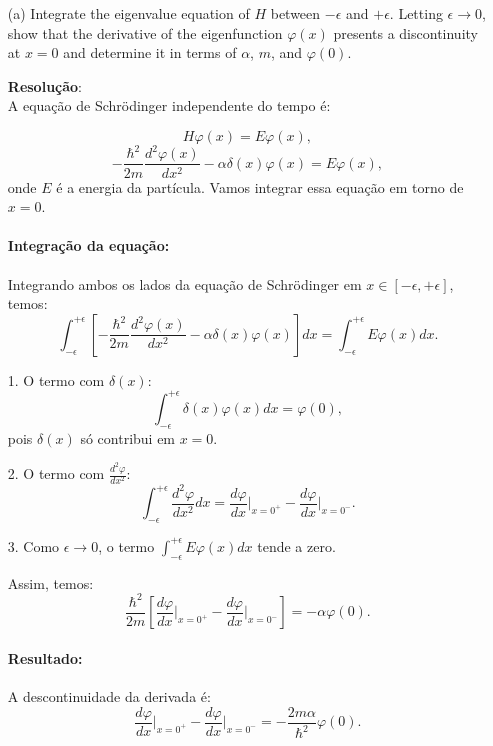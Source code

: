\documentclass[a4paper,12pt]{article}
\begin{document}
\begin{enumerate}
    \item[(a)] Integrate the eigenvalue equation of \( H \) between \( -\epsilon \) and \( +\epsilon \). Letting \( \epsilon \to 0 \), show that the derivative of the eigenfunction \( \varphi(x) \) presents a discontinuity at \( x = 0 \) and determine it in terms of \( \alpha \), \( m \), and \( \varphi(0) \).

    \textbf{Resolu\c{c}\~ao}:\\
    A equação de Schrödinger independente do tempo é:

    \[
    H \varphi(x) = E \varphi(x),
    \]
\[
-\frac{\hbar^2}{2m} \frac{d^2 \varphi(x)}{dx^2} - \alpha \delta(x) \varphi(x) = E \varphi(x),
\]
onde \( E \) é a energia da partícula. Vamos integrar essa equação em torno de \( x = 0 \).

\paragraph{Integração da equação:}
Integrando ambos os lados da equação de Schrödinger em \( x \in [-\epsilon, +\epsilon] \), temos:
\[
\int_{-\epsilon}^{+\epsilon} \left[ -\frac{\hbar^2}{2m} \frac{d^2 \varphi(x)}{dx^2} - \alpha \delta(x) \varphi(x) \right] dx = \int_{-\epsilon}^{+\epsilon} E \varphi(x) dx.
\]

1. O termo com \( \delta(x) \):
\[
\int_{-\epsilon}^{+\epsilon} \delta(x) \varphi(x) dx = \varphi(0),
\]
pois \( \delta(x) \) só contribui em \( x = 0 \).

2. O termo com \( \frac{d^2 \varphi}{dx^2} \):
\[
\int_{-\epsilon}^{+\epsilon} \frac{d^2 \varphi}{dx^2} dx = \frac{d\varphi}{dx} \bigg|_{x=0^+} - \frac{d\varphi}{dx} \bigg|_{x=0^-}.
\]

3. Como \( \epsilon \to 0 \), o termo \( \int_{-\epsilon}^{+\epsilon} E \varphi(x) dx \) tende a zero.

Assim, temos:
\[
\frac{\hbar^2}{2m} \left[ \frac{d\varphi}{dx} \bigg|_{x=0^+} - \frac{d\varphi}{dx} \bigg|_{x=0^-} \right] = -\alpha \varphi(0).
\]

\paragraph{Resultado:}
A descontinuidade da derivada é:
\[
\frac{d\varphi}{dx} \bigg|_{x=0^+} - \frac{d\varphi}{dx} \bigg|_{x=0^-} = -\frac{2m\alpha}{\hbar^2} \varphi(0).
\]
    

\end{enumerate}
\end{document}
